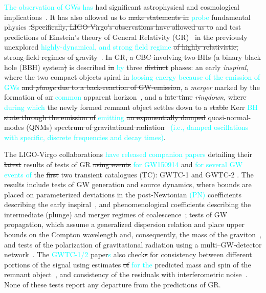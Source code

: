 \documentclass[twocolumn,prd,aps,superscriptaddress,preprintnumbers,tightenlines,showpacs,nofootinbib,eqsecnum,amsfonts,amsmath]{revtex4-1}
\newcommand{\ab}[1]{\textcolor{cyan}{#1}}
\begin{document}
\ab{The observation of GWs has} had significant astrophysical and cosmological
implications~\citep{LSC_2016astroph,gw170817_mma,gw170817_joint,gw170817_hubble}. It
has also allowed us to \sout{make statements in} \ab{probe} fundamental
physics \sout{.Specifically, LIGO-Virgo's observations have allowed us to} and 
test predictions of Einstein's theory of General Relativity 
(GR)~\citep{GR} in the previously unexplored \ab{highly-dynamical, and strong field 
regime} \sout{of highly relativistic, strong-field regimes of
gravity}~\citep{LSC_2016grtests,GW170817_TGR,gwtc1_tgr}. In GR\sout{, a CBC
involving two BHs (}a binary black hole (BBH) system\sout{)} is described \sout{in} \ab{by}
three \sout{distinct} phases: an early \textit{inspiral}, where the two
compact objects spiral in \ab{loosing energy because of the emission of GWs} \sout{and \textit{plunge} due to a back-reaction
of GW-emission}, a \textit{merger} marked by the
formation of a\sout{n} \ab{common} apparent horizon~\citep{NRpaper}, and a \sout{late-time} 
\textit{ringdown}, \sout{where} \ab{during which} the newly formed remnant object settles down
to a \sout{stable} Kerr \ab{BH} \sout{state through the emission of} \ab{emitting} \sout{an exponentially damped} 
quasi-normal-modes (QNMs) \sout{spectrum of gravitational
radiation}~\citep{vishu,earlyqnmpapers} \ab{(i.e., damped oscillations with specific, discrete 
frequencies and decay times)}.

The LIGO-Virgo collaborations \ab{have released companion papers \cite{}} detailing their \sout{latest} results 
of tests of GR  \sout{using events} \ab{for GW150914} \cite{} and \ab{for several GW events of} 
the \sout{first} two transient catalogues (TC): GWTC-1\cite{}  and GWTC-2 \cite{}. 
The results include tests of GW generation and source dynamics, where bounds are placed on
parameterized deviations in the post-Newtonian \ab{(PN)} coefficients describing
the early inspiral~\citep{earlydevelopmentpapers}, and
phenomenological coefficients describing the intermediate (plunge) and
merger regimes of coalescence~\citep{TIGERmethodspapers}; tests of GW
propagation, which assume a generalized dispersion relation and place
upper bounds on the Compton wavelength and, consequently, the mass of
the graviton~\citep{gw170104,samajdar2017projected}, and tests of the
polarization of gravitational radiation using a
multi--GW-detector network~\citep{gw170814,isi2017probing}. The \ab{GWTC-1/2} paper\ab{s} also 
check\sout{s} for consistency between different portions of the signal using estimates
\sout{of} \ab{for the} predicted mass and spin of the remnant
object~\citep{Ghosh:2016xx,Ghosh:2017gfp,LSC_2016grtests}, and
consistency of the residuals with interferometric
noise~\citep{Ghonge:2020suv,gwtc1_tgr}. None of these tests report any
departure from the predictions of GR.
\end{document}
